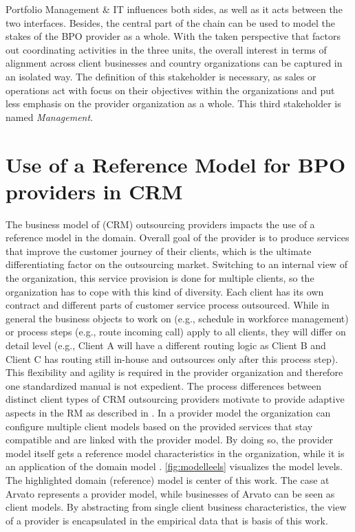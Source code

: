   Portfolio Management \& IT influences both sides, as well as it acts between the two interfaces. Besides, the central part of the chain can be used to model the stakes of the BPO provider as a whole. With the taken perspective that factors out coordinating activities in the three units, the overall interest in terms of alignment across client businesses and country organizations can be captured in an isolated way. The definition of this stakeholder is necessary, as sales or operations act with focus on their objectives within the organizations and put less emphasis on the provider organization as a whole. This third stakeholder is named \textit{Management}. 
  

\section{Use of a Reference Model for BPO providers in CRM}
\label{sec:refmodusearvato}
The business model of (CRM) outsourcing providers impacts the use of a reference model in the domain. Overall goal of the provider is to produce services that improve the customer journey of their clients, which is the ultimate differentiating factor on the outsourcing market. Switching to an internal view of the organization, this service provision is done for multiple clients, so the organization has to cope with this kind of diversity. Each client has its own contract and different parts of customer service process outsourced. While in general the business objects to work on (e.g., schedule in workforce management) or process steps (e.g., route incoming call) apply to all clients, they will differ on detail level (e.g., Client A will have a different routing logic as Client B and Client C has routing still in-house and outsources only after this process step). This flexibility and agility is required in the provider organization and therefore one standardized manual is not expedient. 
The process differences between distinct client types of CRM outsourcing providers motivate to provide adaptive aspects in the \acrshort{RM} as described in \citep{delfmann2006adaptive}. In a provider model the organization can configure multiple client models based on the provided services that stay compatible and are linked with the provider model. By doing so, the provider model itself gets a reference model characteristics in the organization, while it is an application of the domain model . \Fig \ref{fig:modelleels} visualizes the model levels. The highlighted domain (reference) model is center of this work. The case at Arvato represents a provider model, while businesses of Arvato can be seen as client models. By abstracting from single client business characteristics, the view of a provider is encapsulated in the empirical data that is basis of this work. 
